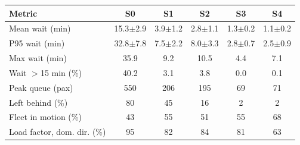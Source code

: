 \begin{tabular}{@{}lccccc@{}}\toprule
Metric & S0 & S1 & S2 & S3 & S4 \\ \midrule
Mean wait (min) & 15.3$\pm$2.9 & 3.9$\pm$1.2 & 2.8$\pm$1.1 & 1.3$\pm$0.2 & 1.1$\pm$0.2 \\
P95 wait (min) & 32.8$\pm$7.8 & 7.5$\pm$2.2 & 8.0$\pm$3.3 & 2.8$\pm$0.7 & 2.5$\pm$0.9 \\
Max wait (min) & 35.9 & 9.2 & 10.5 & 4.4 & 7.1 \\
Wait $>$15 min (\%) & 40.2 & 3.1 & 3.8 & 0.0 & 0.1 \\
Peak queue (pax) & 550 & 206 & 195 & 69 & 71 \\
Left behind (\%) & 80 & 45 & 16 & 2 & 2 \\
Fleet in motion (\%) & 43 & 55 & 51 & 55 & 68 \\
Load factor, dom. dir. (\%) & 95 & 82 & 84 & 81 & 63 \\
\bottomrule\end{tabular}
